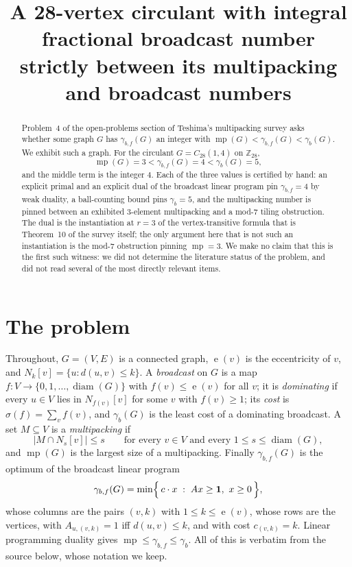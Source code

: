 \documentclass[11pt]{amsart}
\title[A circulant with integral $\gbf$ strictly between $\mult$ and $\gb$]
{A 28-vertex circulant with integral fractional broadcast number strictly
between its multipacking and broadcast numbers}
\date{}
\theoremstyle{remark}
\newcommand{\mult}{\operatorname{mp}}
\newcommand{\gb}{\gamma_b}
\newcommand{\gbf}{\gamma_{b,f}}
\newcommand{\ecc}{\operatorname{e}}
\newcommand{\diam}{\operatorname{diam}}
\newcommand{\Zn}[1]{\mathbb Z_{#1}}
\begin{document}
\begin{abstract}
Problem~4 of the open-problems section of Teshima's multipacking survey asks
whether some graph $G$ has $\gbf(G)$ an integer with
$\mult(G)<\gbf(G)<\gb(G)$. We exhibit such a graph. For the circulant
$G=C_{28}(1,4)$ on $\Zn{28}$,
\[
 \mult(G)=3<\gbf(G)=4<\gb(G)=5 ,
\]
and the middle term is the integer $4$. Each of the three values is certified by hand: an
explicit primal and an explicit dual of the broadcast linear program pin $\gbf=4$ by
weak duality, a ball-counting bound pins $\gb=5$, and the multipacking number is pinned
between an exhibited $3$-element multipacking and a mod-$7$ tiling obstruction. The dual
is the instantiation at $r=3$ of the vertex-transitive formula that is Theorem~10 of the
survey itself; the only argument here that is not such an instantiation is the mod-$7$
obstruction pinning $\mult=3$. We make no claim that this is the first such witness: we
did not determine the literature status of the problem, and did not read several of the
most directly relevant items.
\end{abstract}

\maketitle

\section{The problem}

Throughout, $G=(V,E)$ is a connected graph, $\ecc(v)$ is the eccentricity of $v$, and
$N_k[v]=\{u: d(u,v)\le k\}$. A \emph{broadcast} on $G$ is a map
$f:V\to\{0,1,\dots,\diam(G)\}$ with $f(v)\le \ecc(v)$ for all $v$; it is
\emph{dominating} if every $u\in V$ lies in $N_{f(v)}[v]$ for some $v$ with $f(v)\ge 1$;
its \emph{cost} is $\sigma(f)=\sum_v f(v)$, and $\gb(G)$ is the least cost of a
dominating broadcast. A set $M\subseteq V$ is a \emph{multipacking} if
\begin{equation}\label{eq:mp}
 |M\cap N_s[v]|\le s
 \qquad\text{for every }v\in V\text{ and every }1\le s\le\diam(G),
\end{equation}
and $\mult(G)$ is the largest size of a multipacking. Finally $\gbf(G)$ is the optimum of
the broadcast linear program
\begin{equation}\label{eq:lp}
 \gbf(G)=\min\Bigl\{\,c\cdot x \;:\; Ax\ge \mathbf 1,\ x\ge 0\,\Bigr\},
\end{equation}
whose columns are the pairs $(v,k)$ with $1\le k\le \ecc(v)$, whose rows are the vertices,
with $A_{u,(v,k)}=1$ iff $d(u,v)\le k$, and with cost $c_{(v,k)}=k$. Linear programming
duality gives $\mult\le \gbf\le\gb$. All of this is verbatim from the source below, whose
notation we keep.
\end{document}
